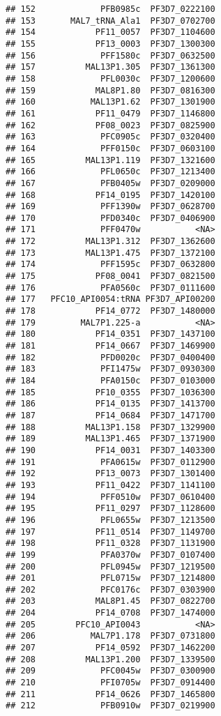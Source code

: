 \documentclass[12pt, a4paper]{article}\usepackage[]{graphicx}\usepackage[]{color}
\makeatletter
\newenvironment{kframe}{%
 \def\at@end@of@kframe{}%
 \ifinner\ifhmode%
  \def\at@end@of@kframe{\end{minipage}}%
  \begin{minipage}{\columnwidth}%
 \fi\fi%
 \def\FrameCommand##1{\hskip\@totalleftmargin \hskip-\fboxsep
 \colorbox{shadecolor}{##1}\hskip-\fboxsep
     \hskip-\linewidth \hskip-\@totalleftmargin \hskip\columnwidth}%
 \MakeFramed {\advance\hsize-\width
   \@totalleftmargin\z@ \linewidth\hsize
   \@setminipage}}%
 {\par\unskip\endMakeFramed%
 \at@end@of@kframe}
\newenvironment{knitrout}{}{} %
\makeatother
\begin{document}
\begin{knitrout}
\begin{kframe}
\begin{verbatim}
## 152             PFB0985c  PF3D7_0222100
## 153       MAL7_tRNA_Ala1  PF3D7_0702700
## 154            PF11_0057  PF3D7_1104600
## 155            PF13_0003  PF3D7_1300300
## 156             PFF1580c  PF3D7_0632500
## 157          MAL13P1.305  PF3D7_1361300
## 158             PFL0030c  PF3D7_1200600
## 159            MAL8P1.80  PF3D7_0816300
## 160           MAL13P1.62  PF3D7_1301900
## 161            PF11_0479  PF3D7_1146800
## 162            PF08_0023  PF3D7_0825900
## 163             PFC0905c  PF3D7_0320400
## 164             PFF0150c  PF3D7_0603100
## 165          MAL13P1.119  PF3D7_1321600
## 166             PFL0650c  PF3D7_1213400
## 167             PFB0405w  PF3D7_0209000
## 168            PF14_0195  PF3D7_1420100
## 169             PFF1390w  PF3D7_0628700
## 170             PFD0340c  PF3D7_0406900
## 171             PFF0470w           <NA>
## 172          MAL13P1.312  PF3D7_1362600
## 173          MAL13P1.475  PF3D7_1372100
## 174             PFF1595c  PF3D7_0632800
## 175            PF08_0041  PF3D7_0821500
## 176             PFA0560c  PF3D7_0111600
## 177   PFC10_API0054:tRNA PF3D7_API00200
## 178            PF14_0772  PF3D7_1480000
## 179         MAL7P1.225-a           <NA>
## 180            PF14_0351  PF3D7_1437100
## 181            PF14_0667  PF3D7_1469900
## 182             PFD0020c  PF3D7_0400400
## 183             PFI1475w  PF3D7_0930300
## 184             PFA0150c  PF3D7_0103000
## 185            PF10_0355  PF3D7_1036300
## 186            PF14_0135  PF3D7_1413700
## 187            PF14_0684  PF3D7_1471700
## 188          MAL13P1.158  PF3D7_1329900
## 189          MAL13P1.465  PF3D7_1371900
## 190            PF14_0031  PF3D7_1403300
## 191             PFA0615w  PF3D7_0112900
## 192            PF13_0073  PF3D7_1301400
## 193            PF11_0422  PF3D7_1141100
## 194             PFF0510w  PF3D7_0610400
## 195            PF11_0297  PF3D7_1128600
## 196             PFL0655w  PF3D7_1213500
## 197            PF11_0514  PF3D7_1149700
## 198            PF11_0328  PF3D7_1131900
## 199             PFA0370w  PF3D7_0107400
## 200             PFL0945w  PF3D7_1219500
## 201             PFL0715w  PF3D7_1214800
## 202             PFC0176c  PF3D7_0303900
## 203            MAL8P1.45  PF3D7_0822700
## 204            PF14_0708  PF3D7_1474000
## 205        PFC10_API0043           <NA>
## 206           MAL7P1.178  PF3D7_0731800
## 207            PF14_0592  PF3D7_1462200
## 208          MAL13P1.200  PF3D7_1339500
## 209             PFC0045w  PF3D7_0300900
## 210             PFI0705w  PF3D7_0914400
## 211            PF14_0626  PF3D7_1465800
## 212             PFB0910w  PF3D7_0219900

\end{verbatim}
\end{kframe}
\end{knitrout}
\end{document}
